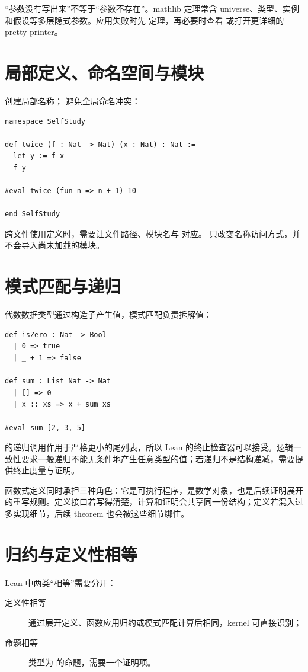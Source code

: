 \begin{warningbox}
“参数没有写出来”不等于“参数不存在”。mathlib 定理常含 universe、类型、实例和假设等多层隐式参数。应用失败时先  定理，再必要时查看  或打开更详细的 pretty printer。
\end{warningbox}

\section{局部定义、命名空间与模块}

 创建局部名称； 避免全局命名冲突：
\begin{lstlisting}
namespace SelfStudy

def twice (f : Nat -> Nat) (x : Nat) : Nat :=
  let y := f x
  f y

#eval twice (fun n => n + 1) 10

end SelfStudy
\end{lstlisting}
跨文件使用定义时，需要让文件路径、模块名与  对应。 只改变名称访问方式，并不会导入尚未加载的模块。

\section{模式匹配与递归}

代数数据类型通过构造子产生值，模式匹配负责拆解值：
\begin{lstlisting}
def isZero : Nat -> Bool
  | 0 => true
  | _ + 1 => false

def sum : List Nat -> Nat
  | [] => 0
  | x :: xs => x + sum xs

#eval sum [2, 3, 5]
\end{lstlisting}
 的递归调用作用于严格更小的尾列表，所以 Lean 的终止检查器可以接受。逻辑一致性要求一般递归不能无条件地产生任意类型的值；若递归不是结构递减，需要提供终止度量与证明。

\begin{intuitionbox}
函数式定义同时承担三种角色：它是可执行程序，是数学对象，也是后续证明展开的重写规则。定义接口若写得清楚，计算和证明会共享同一份结构；定义若混入过多实现细节，后续 theorem 也会被这些细节绑住。
\end{intuitionbox}

\section{归约与定义性相等}

Lean 中两类“相等”需要分开：
\begin{description}
  \item[定义性相等] 通过展开定义、函数应用归约或模式匹配计算后相同，kernel 可直接识别；
  \item[命题相等] 类型为  的命题，需要一个证明项。
\end{description}

